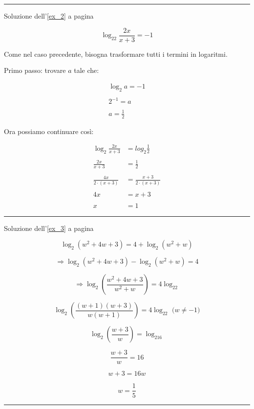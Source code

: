 \vspace{1cm}
\hrule
\vspace{1cm}

Soluzione dell'\ref{ex_2} a pagina \pageref{ex_2}\label{sol_2}

\[
\log_22\frac{2x}{x+3}=-1
\]



Come nel caso precedente, bisogna trasformare tutti i termini in logaritmi.


Primo passo: trovare $a$ tale che:

\[
\begin{split}
\log_2a=-1\\
\\
2^{-1}=a\\
\\
a=\frac{1}{2}
\end{split}
\]

Ora possiamo continuare così:

\[
\begin{split}
\log_2\frac{2x}{x+3}&=log_2\frac{1}{2} \\
\\
\frac{2x}{x+3}&=\frac{1}{2} \\
\\
\frac{4x}{2\cdot(x+3)}&=\frac{x+3}{2\cdot(x+3)} \\
\\
4x&=x+3 \\
\\
x&=1
\end{split}
\]


\vspace{1cm}
\hrule
\vspace{1cm}
Soluzione dell'\ref{ex_3} a pagina \pageref{ex_3}\label{sol_3}

\[
\log_2(w^2+4w+3)=4+\log_2(w^2+w)
\]

\[
\Rightarrow\log_2(w^2+4w+3)-\log_2(w^2+w)=4
\]

\[
\Rightarrow
\log_2\left(\frac{
w^2+4w+3
}{
w^2+w
}\right) = 4\log_22
\]

\[
\log_2\left(\frac{
(w+1)(w+3)
}{
w(w+1)
}\right) = 4\log_22 \textrm{ ($w\neq -1$)}
\]

\[
\log_2\left(\frac{w+3}{w}\right) = \log_216
\]

\[
\frac{w+3}{w}=16
\]

\[
w+3=16w
\]

\[
w=\frac{1}{5}
\]

\vspace{1cm}
\hrule
\vspace{1cm}


